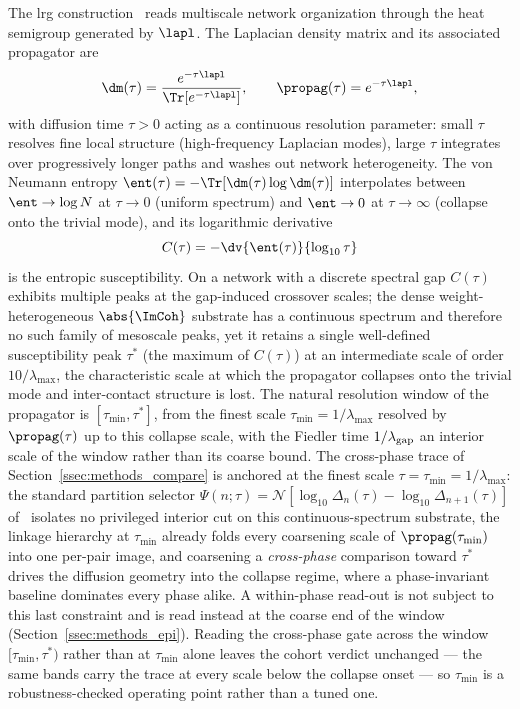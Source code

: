 The \gls{lrg} construction~\cite{villegas2023laplacian,villegas2025multiscale} reads multiscale network organization through the heat semigroup generated by \(\lapl\). The Laplacian density matrix and its associated propagator are
\begin{equation}
    \dm(\tau) = \frac{e^{-\tau\lapl}}{\Tr[e^{-\tau\lapl}]}, \qquad \propag(\tau) = e^{-\tau\lapl},
    \label{eq:methods_density_propagator}
\end{equation}
with diffusion time \(\tau > 0\) acting as a continuous resolution parameter: small \(\tau\) resolves fine local structure (high-frequency Laplacian modes), large \(\tau\) integrates over progressively longer paths and washes out network heterogeneity. The von Neumann entropy \(\ent(\tau) = -\Tr[\dm(\tau) \log \dm(\tau)]\) interpolates between \(\ent \to \log N\) at \(\tau \to 0\) (uniform spectrum) and \(\ent \to 0\) at \(\tau \to \infty\) (collapse onto the trivial mode), and its logarithmic derivative
\begin{equation}
    C(\tau) = -\dv{\ent(\tau)}{\log_{10}\tau}
    \label{eq:methods_susceptibility}
\end{equation}
is the entropic susceptibility. On a network with a discrete spectral gap \(C(\tau)\) exhibits multiple peaks at the gap-induced crossover scales; the dense weight-heterogeneous \(\abs{\ImCoh}\) substrate has a continuous spectrum and therefore no such family of mesoscale peaks, yet it retains a single well-defined susceptibility peak \(\tau^{\ast}\) (the maximum of \(C(\tau)\)) at an intermediate scale of order \(10/\lambda_{\max}\), the characteristic scale at which the propagator collapses onto the trivial mode and inter-contact structure is lost. The natural resolution window of the propagator is \([\tau_{\min}, \tau^{\ast}]\), from the finest scale \(\tau_{\min} = 1/\lambda_{\max}\) resolved by \(\propag(\tau)\) up to this collapse scale, with the Fiedler time \(1/\lambda_{\rm gap}\) an interior scale of the window rather than its coarse bound. The cross-phase trace of Section~\ref{ssec:methods_compare} is anchored at the finest scale \(\tau = \tau_{\min} = 1/\lambda_{\max}\): the standard partition selector \(\Psi(n;\tau) = \mathcal{N}[\log_{10} \Delta_{n}(\tau) - \log_{10}\Delta_{n+1}(\tau)]\) of~\cite{villegas2025multiscale} isolates no privileged interior cut on this continuous-spectrum substrate, the linkage hierarchy at \(\tau_{\min}\) already folds every coarsening scale of \(\propag(\tau_{\min})\) into one per-pair image, and coarsening a \emph{cross-phase} comparison toward \(\tau^{\ast}\) drives the diffusion geometry into the collapse regime, where a phase-invariant baseline dominates every phase alike. A within-phase read-out is not subject to this last constraint and is read instead at the coarse end of the window (Section~\ref{ssec:methods_epi}). Reading the cross-phase gate across the window \([\tau_{\min}, \tau^{\ast})\) rather than at \(\tau_{\min}\) alone leaves the cohort verdict unchanged --- the same bands carry the trace at every scale below the collapse onset --- so \(\tau_{\min}\) is a robustness-checked operating point rather than a tuned one.

